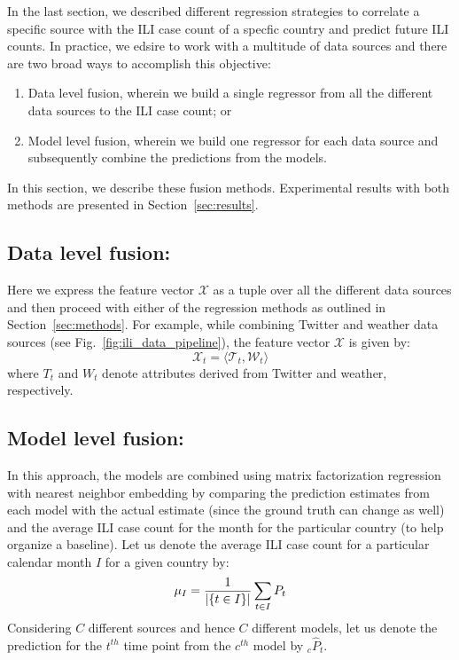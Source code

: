 In the last section, we described different regression strategies to correlate
a specific source with the ILI case count of a specfic country and predict
future ILI counts. In practice, we edsire to work with a multitude of data
sources and there are two broad ways to accomplish this objective:

\begin{enumerate}
  \item Data level fusion, wherein we build a single regressor from all the different data
    sources to the ILI case count; or
  \item Model level fusion, wherein we build one regressor for each data source and 
    subsequently combine the predictions from the models.
\end{enumerate}

\noindent
In this section, we describe these fusion methods. Experimental results with 
both methods are presented in Section~\ref{sec:results}.

\subsection{\label{sec:fusion:data} Data level fusion:}
Here we express the feature vector $\mathcal{X}$ as a tuple over all the different data 
sources and then proceed with either of the regression methods as outlined in Section~\ref{sec:methods}.
For example, while combining Twitter and weather data sources (see Fig.~\ref{fig:ili_data_pipeline}), the 
feature vector $\mathcal{X}$ is given by:
\[\mathcal{X}_t = \langle \mathcal{T}_t, \mathcal{W}_t \rangle
\]
where $T_t$ and $W_t$ denote attributes derived from Twitter and weather, respectively.

\subsection{\label{sec:fusion:model} Model level fusion:}
In this approach, the models are combined using matrix factorization regression with 
nearest neighbor embedding by comparing the
prediction estimates from each model with the actual estimate (since the ground truth
can change as well) and the average
ILI case count for the month for the particular country (to help organize a baseline).
Let us denote the average ILI case count for a particular calendar 
month $I$ for a given country by:
\begin{equation*}
  \mu_I = {1 \over {|\lbrace t \in I\rbrace|}} \sum_{t \in I}P_{t}
\end{equation*}
\noindent
Considering $C$ different sources and hence $C$ different models, 
let us denote the prediction for the $t^{th}$ time point 
from the $c^{th}$ model by ${}_c\widehat{P}_t$.

